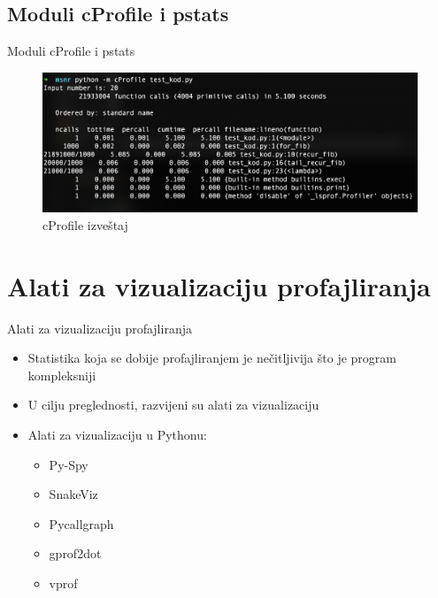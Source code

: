 \documentclass{beamer}
\begin{document}
\subsection{Moduli cProfile i pstats}
\begin{frame}{Moduli cProfile i pstats}
\begin{figure}[h!]
\begin{center}
\includegraphics[scale=0.4]{cProfile_without_import.png}
\end{center}
\caption{cProfile izveštaj}
\label{fig:ps_viz}
\end{figure}

\begin{center}
\end{center}
\end{frame}

\section{Alati za vizualizaciju profajliranja}
\begin{frame}{Alati za vizualizaciju profajliranja}
\begin{itemize}
\item Statistika koja se dobije profajliranjem je nečitljivija što je program kompleksniji
\item U cilju preglednosti, razvijeni su alati za vizualizaciju
\item Alati za vizualizaciju u Pythonu:
\begin{itemize}
\item Py-Spy
\item SnakeViz
\item Pycallgraph
\item gprof2dot
\item vprof
\end{itemize}
\end{itemize}
\end{frame}
\end{document}
